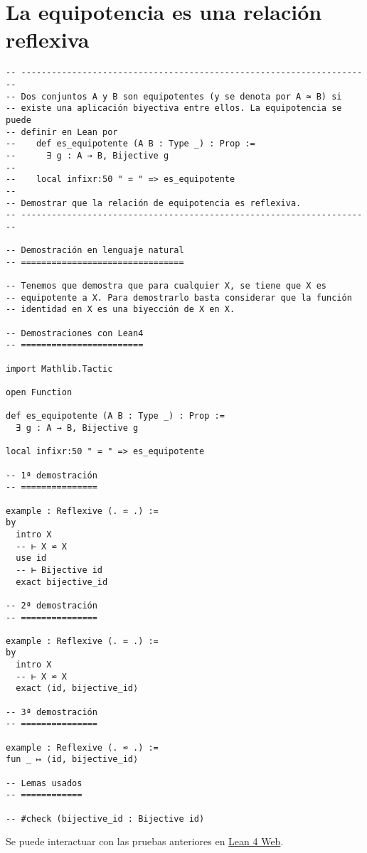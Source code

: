 \section{La equipotencia es una relación reflexiva}
\label{sec:org3f468aa}
\begin{verbatim}
-- ---------------------------------------------------------------------
-- Dos conjuntos A y B son equipotentes (y se denota por A ≃ B) si
-- existe una aplicación biyectiva entre ellos. La equipotencia se puede
-- definir en Lean por
--    def es_equipotente (A B : Type _) : Prop :=
--      ∃ g : A → B, Bijective g
--
--    local infixr:50 " ⋍ " => es_equipotente
--
-- Demostrar que la relación de equipotencia es reflexiva.
-- ---------------------------------------------------------------------

-- Demostración en lenguaje natural
-- ================================

-- Tenemos que demostra que para cualquier X, se tiene que X es
-- equipotente a X. Para demostrarlo basta considerar que la función
-- identidad en X es una biyección de X en X.

-- Demostraciones con Lean4
-- ========================

import Mathlib.Tactic

open Function

def es_equipotente (A B : Type _) : Prop :=
  ∃ g : A → B, Bijective g

local infixr:50 " ⋍ " => es_equipotente

-- 1ª demostración
-- ===============

example : Reflexive (. ⋍ .) :=
by
  intro X
  -- ⊢ X ⋍ X
  use id
  -- ⊢ Bijective id
  exact bijective_id

-- 2ª demostración
-- ===============

example : Reflexive (. ⋍ .) :=
by
  intro X
  -- ⊢ X ⋍ X
  exact ⟨id, bijective_id⟩

-- 3ª demostración
-- ===============

example : Reflexive (. ⋍ .) :=
fun _ ↦ ⟨id, bijective_id⟩

-- Lemas usados
-- ============

-- #check (bijective_id : Bijective id)
\end{verbatim}
Se puede interactuar con las pruebas anteriores en \href{https://lean.math.hhu.de/\#url=https://raw.githubusercontent.com/jaalonso/Calculemus2/main/src/La\_equipotencia\_es\_una\_relacion\_reflexiva.lean}{Lean 4 Web}.

